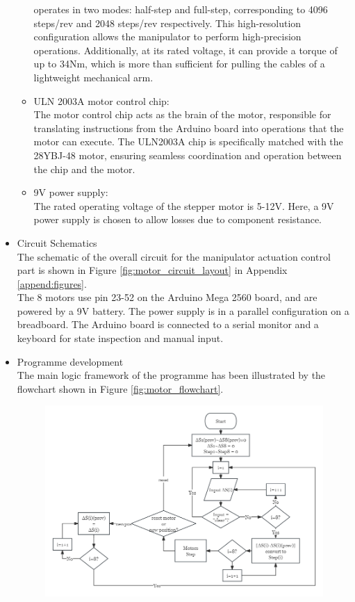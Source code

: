 \begin{itemize}
\begin{itemize}
        operates in two modes: half-step and full-step, corresponding to 4096 steps/rev and 2048 steps/rev 
        respectively. This high-resolution configuration allows the manipulator to perform high-precision 
        operations. Additionally, at its rated voltage, it can provide a torque of up to 34Nm, which is more than 
        sufficient for pulling the cables of a lightweight mechanical arm.
        \item ULN 2003A motor control chip: \\
        The motor control chip acts as the brain of the motor, responsible for translating instructions from the 
        Arduino board into operations that the motor can execute. The ULN2003A chip is specifically matched with 
        the 28YBJ-48 motor, ensuring seamless coordination and operation between the chip and the motor. 
        \item 9V power supply: \\
        The rated operating voltage of the stepper motor is 5-12V. Here, a 9V power supply is chosen to allow 
        losses due to component resistance. 
    \end{itemize}
    \item Circuit Schematics \\
    The schematic of the overall circuit for the manipulator actuation control part is shown in 
    Figure \ref{fig:motor_circuit_layout} in Appendix \ref{append:figures}. \\
    The 8 motors use pin 23-52 on the Arduino Mega 2560 board, and are powered by a 9V battery. The power supply 
    is in a parallel configuration on a breadboard. The Arduino board is connected to a serial monitor and a 
    keyboard for state inspection and manual input.
    \item Programme development \\
    The main logic framework of the programme has been illustrated by the flowchart shown in Figure \ref{fig:motor_flowchart}.
    \vspace{-5mm}
    \begin{figure}[H] %
        \centering 
        \captionsetup{labelsep=colon}
        \includegraphics[width=1.0\textwidth]{Image/Design/flowchart_arduino_motor.png} 

\end{figure}
\end{itemize}
